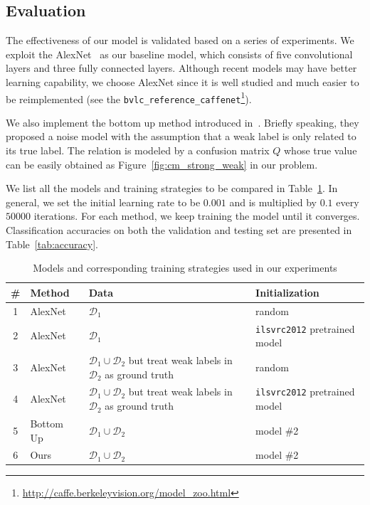 \documentclass[10pt,twocolumn,letterpaper]{article}
\begin{document}

\subsection{Evaluation} %
\label{sub:evaluation}
The effectiveness of our model is validated based on a series of experiments. We exploit the AlexNet~\cite{krizhevsky2012imagenet} as our baseline model, which consists of five convolutional layers and three fully connected layers. Although recent models may have better learning capability, we choose AlexNet since it is well studied and much easier to be reimplemented (see the \texttt{bvlc\_reference\_caffenet}\footnote{\url{http://caffe.berkeleyvision.org/model_zoo.html}}).

We also implement the bottom up method introduced in~\cite{sukhbaatar2014learning}. Briefly speaking, they proposed a noise model with the assumption that a weak label is only related to its true label. The relation is modeled by a confusion matrix $Q$ whose true value can be easily obtained as Figure~\ref{fig:cm_strong_weak} in our problem.

We list all the models and training strategies to be compared in Table~\ref{tab:models}.  In general, we set the initial learning rate to be $0.001$ and is multiplied by $0.1$ every $50000$ iterations. For each method, we keep training the model until it converges. Classification accuracies on both the validation and testing set are presented in Table~\ref{tab:accuracy}.

\begin{table}
\begin{center}
\begin{tabular}{c|p{3.5em}|p{8em}|p{6em}}
\hline
\# & Method & Data & Initialization \\
\hline\hline
1 & AlexNet & $\mathcal{D}_1$ & random \\
\hline
2 & AlexNet & $\mathcal{D}_1$ & \texttt{ilsvrc2012} pretrained model \\
\hline
3 & AlexNet & $\mathcal{D}_1 \cup \mathcal{D}_2$ but treat weak labels in $\mathcal{D}_2$ as ground truth & random \\
\hline
4 & AlexNet & $\mathcal{D}_1 \cup \mathcal{D}_2$ but treat weak labels in $\mathcal{D}_2$ as ground truth & \texttt{ilsvrc2012} pretrained model \\
\hline
5 & Bottom Up~\cite{sukhbaatar2014learning} & $\mathcal{D}_1 \cup \mathcal{D}_2$ & model \#2 \\
\hline
6 & Ours & $\mathcal{D}_1 \cup \mathcal{D}_2$ & model \#2 \\
\hline
\end{tabular}
\end{center}
\caption{Models and corresponding training strategies used in our experiments}
\label{tab:models}
\end{table}
\end{document}
